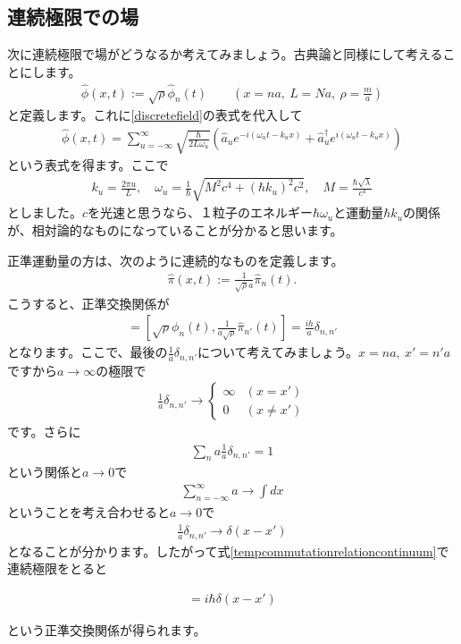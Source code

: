 \documentclass[report,paper=a4, fontsize=12pt, line_length=16cm, number_of_lines=33,dvipdfmx]{jlreq}
\newenvironment{important}{\begin{tcolorbox}[
  colback = white,
  colframe = red!35,
  boxrule = 2mm,
  fonttitle = \bfseries,
  after = \noindent] }{\end{tcolorbox}}
\numberwithin{equation}{chapter}
\newcommand{\phih}{\hat{\phi}}
\newcommand{\pih}{\hat{\pi}}
\newcommand{\ah}{\hat{a}}
\begin{document}
\subsection{連続極限での場}
次に連続極限で場がどうなるか考えてみましょう。古典論と同様にして考えることにします。
\begin{align}
  \phih(x,t):=\sqrt{\rho}\phih_{n}(t)\qquad (x=na,\ L=Na,\ \rho=\frac{m}{a})
\end{align}
と定義します。これに\eqref{discretefield}の表式を代入して
\begin{align}
  \phih(x,t)=\sum_{u=-\infty}^{\infty}\sqrt{\frac{\hbar}{2L\omega_{u}}}(\ah_{u}e^{-i(\omega_ut-k_ux)}
  +\ah^{\dag}_{u}e^{i(\omega_ut-k_ux)})
\end{align}
という表式を得ます。ここで
\begin{align}
  k_u=\frac{2\pi u}{L},\quad \omega_{u}=\frac{1}{\hbar}\sqrt{M^2c^4+(\hbar k_u)^2c^2},\quad M=\frac{\hbar\sqrt{\lambda}}{c^4}
\end{align}
としました。$c$を光速と思うなら、１粒子のエネルギー$\hbar \omega_{u}$と運動量$\hbar k_u$の関係が、相対論的なものになっていることが分かると思います。

正準運動量の方は、次のように連続的なものを定義します。
\begin{align}
  \pih(x,t):=\frac{1}{\sqrt{\rho}a}\pih_{n}(t).
\end{align}
こうすると、正準交換関係が
\begin{align}
  [\phih(x,t),\pih(x',t)]=[\sqrt{\rho}\phi_{n}(t),\frac{1}{a\sqrt{\rho}}\pih_{n'}(t)]=\frac{ih}{a}\delta_{n,n'}
  \label{tempcommutationrelationcontinuum}
\end{align}
となります。ここで、最後の$\frac{1}{a}\delta_{n,n'}$について考えてみましょう。$x=na,\ x'=n'a$ですから$a\to\infty$の極限で
\begin{align}
  \frac{1}{a}\delta_{n,n'}\to
  \begin{cases}
    \infty & (x=x')\\
    0 & (x\ne x')
  \end{cases}
\end{align}
です。さらに
\begin{align}
  \sum_{n}a \frac{1}{a}\delta_{n,n'}=1
\end{align}
という関係と$a\to 0$で
\begin{align}
  \sum_{n=-\infty}^{\infty}a\to \int dx
\end{align}
ということを考え合わせると$a\to 0$で
\begin{align}
  \frac{1}{a}\delta_{n,n'}\to \delta(x-x')
\end{align}
となることが分かります。したがって式\eqref{tempcommutationrelationcontinuum}で連続極限をとると
\begin{important}
  \begin{align}
    [\phih(x,t),\pih(x',t)]=i\hbar\delta(x-x')
  \end{align}
\end{important}
という正準交換関係が得られます。
\end{document}
